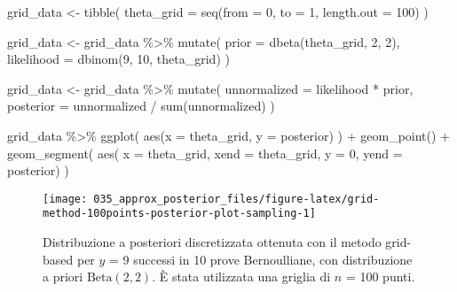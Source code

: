 \documentclass[
]{memoir}
\newenvironment{Shaded}{\begin{snugshade}}{\end{snugshade}}
\newcommand{\AttributeTok}[1]{\textcolor[rgb]{0.77,0.63,0.00}{#1}}
\newcommand{\DecValTok}[1]{\textcolor[rgb]{0.00,0.00,0.81}{#1}}
\newcommand{\FunctionTok}[1]{\textcolor[rgb]{0.00,0.00,0.00}{#1}}
\newcommand{\NormalTok}[1]{#1}
\newcommand{\OtherTok}[1]{\textcolor[rgb]{0.56,0.35,0.01}{#1}}
\newcommand{\SpecialCharTok}[1]{\textcolor[rgb]{0.00,0.00,0.00}{#1}}
\begin{document}
\begin{Shaded}
\begin{Highlighting}[]
\NormalTok{grid\_data  }\OtherTok{\textless{}{-}} \FunctionTok{tibble}\NormalTok{(}
  \AttributeTok{theta\_grid =} \FunctionTok{seq}\NormalTok{(}\AttributeTok{from =} \DecValTok{0}\NormalTok{, }\AttributeTok{to =} \DecValTok{1}\NormalTok{, }\AttributeTok{length.out =} \DecValTok{100}\NormalTok{)}
\NormalTok{)}

\NormalTok{grid\_data }\OtherTok{\textless{}{-}}\NormalTok{ grid\_data }\SpecialCharTok{\%\textgreater{}\%}
  \FunctionTok{mutate}\NormalTok{(}
    \AttributeTok{prior =} \FunctionTok{dbeta}\NormalTok{(theta\_grid, }\DecValTok{2}\NormalTok{, }\DecValTok{2}\NormalTok{),}
    \AttributeTok{likelihood =} \FunctionTok{dbinom}\NormalTok{(}\DecValTok{9}\NormalTok{, }\DecValTok{10}\NormalTok{, theta\_grid)}
\NormalTok{  )}

\NormalTok{grid\_data }\OtherTok{\textless{}{-}}\NormalTok{ grid\_data }\SpecialCharTok{\%\textgreater{}\%}
  \FunctionTok{mutate}\NormalTok{(}
    \AttributeTok{unnormalized =}\NormalTok{ likelihood }\SpecialCharTok{*}\NormalTok{ prior,}
    \AttributeTok{posterior =}\NormalTok{ unnormalized }\SpecialCharTok{/} \FunctionTok{sum}\NormalTok{(unnormalized)}
\NormalTok{  )}

\NormalTok{grid\_data }\SpecialCharTok{\%\textgreater{}\%} 
\FunctionTok{ggplot}\NormalTok{(}
  \FunctionTok{aes}\NormalTok{(}\AttributeTok{x =}\NormalTok{ theta\_grid, }\AttributeTok{y =}\NormalTok{ posterior)}
\NormalTok{) }\SpecialCharTok{+}
  \FunctionTok{geom\_point}\NormalTok{() }\SpecialCharTok{+}
  \FunctionTok{geom\_segment}\NormalTok{(}
    \FunctionTok{aes}\NormalTok{(}
      \AttributeTok{x =}\NormalTok{ theta\_grid, }
      \AttributeTok{xend =}\NormalTok{ theta\_grid, }
      \AttributeTok{y =} \DecValTok{0}\NormalTok{, }
      \AttributeTok{yend =}\NormalTok{ posterior)}
\NormalTok{  )}
\end{Highlighting}
\end{Shaded}

\begin{figure}

{\centering \texttt{[image: 035\_approx\_posterior\_files/figure-latex/grid-method-100points-posterior-plot-sampling-1]} 

}

\caption{Distribuzione a posteriori discretizzata ottenuta con il metodo grid-based per $y$ = 9 successi in 10 prove Bernoulliane, con distribuzione a priori $\mbox{Beta}(2, 2)$. È stata utilizzata una griglia di $n$ = 100 punti.}\label{fig:grid-method-100points-posterior-plot-sampling}
\end{figure}
\end{document}
